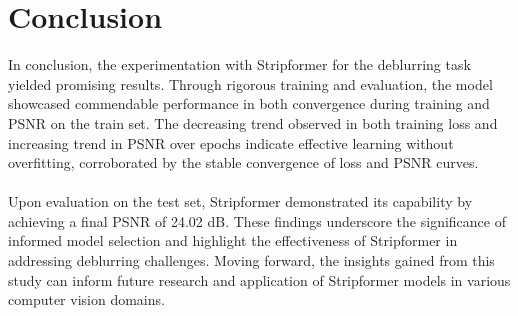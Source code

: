 \documentclass[12pt, a4paper, twoside]{article}
\begin{document}
	\section{Conclusion}
		In conclusion, the experimentation with Stripformer for the deblurring task yielded promising results. Through rigorous training and evaluation, the model showcased commendable performance in both convergence during training and PSNR on the train set. The decreasing trend observed in both training loss and increasing trend in PSNR over epochs indicate effective learning without overfitting, corroborated by the stable convergence of loss and PSNR curves.
		\\
		\\
		Upon evaluation on the test set, Stripformer demonstrated its capability by achieving a final PSNR of 24.02 dB. These findings underscore the significance of informed model selection and highlight the effectiveness of Stripformer in addressing deblurring challenges. Moving forward, the insights gained from this study can inform future research and application of Stripformer models in various computer vision domains.
	
	\printbibliography
\end{document}
